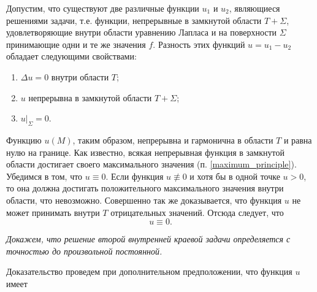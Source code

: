 Допустим, что существуют две различные функции $u_1$ и $u_2$, являющиеся решениями задачи, т.е. функции, непрерывные в замкнутой области $T + \Sigma$, удовлетворяющие внутри области уравнению Лапласа и на поверхности $\Sigma$ принимающие одни и те же значения $f$. Разность этих функций $u = u_1 - u_2$ обладает следующими свойствами:
\begin{enumerate}
	\item $\Delta u = 0$ внутри области $T$;
	
	\item $u$ непрерывна в замкнутой области $T + \Sigma$;
	
	\item $u|_{\Sigma} = 0.$
\end{enumerate}

Функцию $u(M)$, таким образом, непрерывна и гармонична в области $T$ и равна нулю на границе. Как известно, всякая непрерывная функция в замкнутой области достигает своего максимального значения (п. \ref{maximum_principle}). Убедимся в том, что $u \equiv 0$. Если функция $u \not \equiv 0$ и хотя бы в одной точке $u > 0$, то она должна достигать положительного максимального значения внутри области, что невозможно. Совершенно так же доказывается, что функция $u$ не может принимать внутри $T$ отрицательных значений. Отсюда следует, что 
\begin{equation*}
	u \equiv 0.
\end{equation*}

\textit{Докажем, что решение второй внутренней краевой задачи определяется с точностью до произвольной постоянной.}

Доказательство проведем при дополнительном предположении, что функция $u$ имеет 